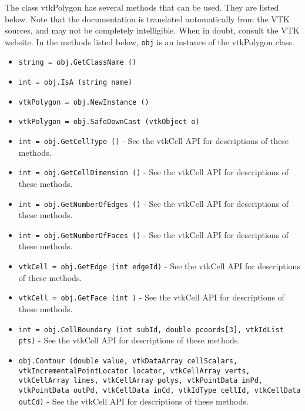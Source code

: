 The class vtkPolygon has several methods that can be used.
  They are listed below.
Note that the documentation is translated automatically from the VTK sources,
and may not be completely intelligible.  When in doubt, consult the VTK website.
In the methods listed below, \verb|obj| is an instance of the vtkPolygon class.
\begin{itemize}
\item  \verb|string = obj.GetClassName ()|

\item  \verb|int = obj.IsA (string name)|

\item  \verb|vtkPolygon = obj.NewInstance ()|

\item  \verb|vtkPolygon = obj.SafeDownCast (vtkObject o)|

\item  \verb|int = obj.GetCellType ()| -  See the vtkCell API for descriptions of these methods.

\item  \verb|int = obj.GetCellDimension ()| -  See the vtkCell API for descriptions of these methods.

\item  \verb|int = obj.GetNumberOfEdges ()| -  See the vtkCell API for descriptions of these methods.

\item  \verb|int = obj.GetNumberOfFaces ()| -  See the vtkCell API for descriptions of these methods.

\item  \verb|vtkCell = obj.GetEdge (int edgeId)| -  See the vtkCell API for descriptions of these methods.

\item  \verb|vtkCell = obj.GetFace (int )| -  See the vtkCell API for descriptions of these methods.

\item  \verb|int = obj.CellBoundary (int subId, double pcoords[3], vtkIdList pts)| -  See the vtkCell API for descriptions of these methods.

\item  \verb|obj.Contour (double value, vtkDataArray cellScalars, vtkIncrementalPointLocator locator, vtkCellArray verts, vtkCellArray lines, vtkCellArray polys, vtkPointData inPd, vtkPointData outPd, vtkCellData inCd, vtkIdType cellId, vtkCellData outCd)| -  See the vtkCell API for descriptions of these methods.


\end{itemize}
